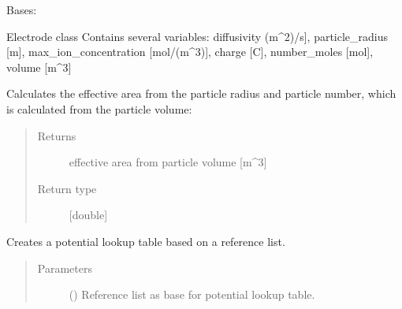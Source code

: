 \documentclass[letterpaper,10pt,english]{sphinxmanual}
\begin{document}
\begin{fulllineitems}
\label{\detokenize{electrode:electrode.Electrode}}
\sphinxAtStartPar
Bases: 

\sphinxAtStartPar
Electrode class
Contains several variables:
diffusivity (m\textasciicircum{}2)/s{]},
particle\_radius {[}m{]},
max\_ion\_concentration {[}mol/(m\textasciicircum{}3){]},
charge {[}C{]}, 
number\_moles {[}mol{]}, 
volume {[}m\textasciicircum{}3{]}

\begin{fulllineitems}
\label{\detokenize{electrode:electrode.Electrode.calculate_effective_area}}
\sphinxAtStartPar
Calculates the effective area from the particle radius and 
particle number, which is calculated from the particle volume:
\begin{quote}\begin{description}
\item[{Returns}] \leavevmode
\sphinxAtStartPar
effective area from particle volume {[}m\textasciicircum{}3{]}

\item[{Return type}] \leavevmode
\sphinxAtStartPar
{[}double{]}

\end{description}\end{quote}

\end{fulllineitems}


\begin{fulllineitems}
\label{\detokenize{electrode:electrode.Electrode.create_potential_lookup_tables}}
\sphinxAtStartPar
Creates a potential lookup table based on a reference list.
\begin{quote}\begin{description}
\item[{Parameters}] \leavevmode
\sphinxAtStartPar
{} (\sphinxstyleliteralemphasis{\sphinxupquote{{[}}}\sphinxstyleliteralemphasis{\sphinxupquote{{]}}}) \textendash{} Reference list as base for potential lookup table.


\end{description}
\end{quote}
\end{fulllineitems}
\end{fulllineitems}
\end{document}
